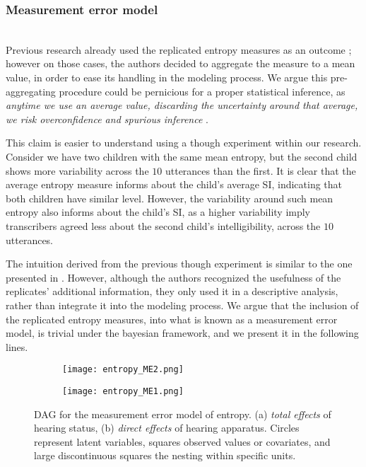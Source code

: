 \subsubsection{Measurement error model} \\
%
Previous research already used the replicated entropy measures as an outcome \citep{Boonen_et_al_2021, Faes_et_al_2021}; however on those cases, the authors decided to aggregate the measure to a mean value, in order to ease its handling in the modeling process. We argue this pre-aggregating procedure could be pernicious for a proper statistical inference, as \textit{anytime we use an average value, discarding the uncertainty around that average, we risk overconfidence and spurious inference} \citep{McElreath_2020}. 

This claim is easier to understand using a though experiment within our research.  Consider we have two children with the same mean entropy, but the second child shows more variability across the $10$ utterances than the first. It is clear that the average entropy measure informs about the child's average SI, indicating that both children have similar level. However, the variability around such mean entropy also informs about the child's SI, as a higher variability imply transcribers agreed less about the second child's intelligibility, across the $10$ utterances. 

The intuition derived from the previous though experiment is similar to the one presented in \citet{Boonen_et_al_2021}. However, although the authors recognized the usefulness of the replicates' additional information, they only used it in a descriptive analysis, rather than integrate it into the modeling process. We argue that the inclusion of the replicated entropy measures, into what is known as a measurement error model, is trivial under the bayesian framework, and we present it in the following lines.
%
\begin{figure}[h]
	\centering
	\begin{subfigure}{0.435\textwidth}
		\centering
		\texttt{[image: entropy\_ME2.png]}
		\caption{}
	\end{subfigure}
	\hfill
	\begin{subfigure}{0.5\textwidth}
		\centering
		\texttt{[image: entropy\_ME1.png]}
		\caption{}
	\end{subfigure}
	\caption[DAG for the measurement error model of entropy.]%
	{DAG for the measurement error model of entropy. (a) \textit{total effects} of hearing status, (b) \textit{direct effects} of hearing apparatus. Circles represent latent variables, squares observed values or covariates, and large discontinuous squares the nesting within specific units.}
	\label{fig:entropy_ME}
\end{figure}
%

